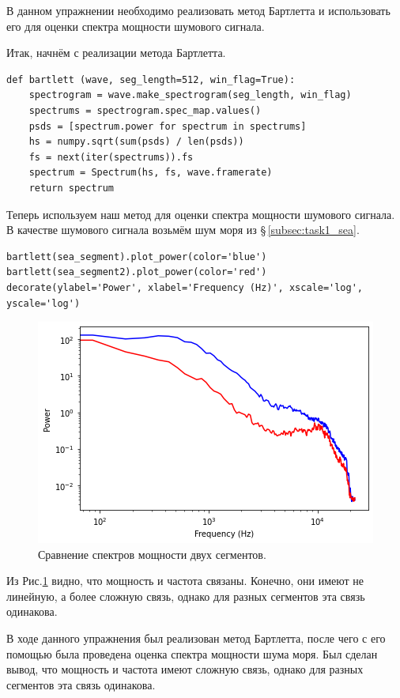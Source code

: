 \documentclass[a4paper, 14pt]{extarticle}
\begin{document}
    В данном упражнении необходимо реализовать метод Бартлетта и использовать его для оценки спектра мощности шумового
    сигнала.

    Итак, начнём с реализации метода Бартлетта.

    \begin{lstlisting}[caption= Метод Бартлетта., label={lst:task2_bartlett}]
def bartlett (wave, seg_length=512, win_flag=True):
    spectrogram = wave.make_spectrogram(seg_length, win_flag)
    spectrums = spectrogram.spec_map.values()
    psds = [spectrum.power for spectrum in spectrums]
    hs = numpy.sqrt(sum(psds) / len(psds))
    fs = next(iter(spectrums)).fs
    spectrum = Spectrum(hs, fs, wave.framerate)
    return spectrum \end{lstlisting}

    Теперь используем наш метод для оценки спектра мощности шумового сигнала. В качестве шумового сигнала возьмём шум
    моря из \S\,\ref{subsec:task1_sea}.

    \begin{lstlisting}[caption= Оценка спектра мощности двух сегментов., label={lst:task2_spectrum}]
bartlett(sea_segment).plot_power(color='blue')
bartlett(sea_segment2).plot_power(color='red')
decorate(ylabel='Power', xlabel='Frequency (Hz)', xscale='log', yscale='log')   \end{lstlisting}

    \begin{figure}[h]
        \centering
        \includegraphics[width=0.6\linewidth]{resources/Images/task2_spectrum}
        \caption{Сравнение спектров мощности двух сегментов.}
        \label{fig:task2_spectrum}
    \end{figure}

    Из Рис.\ref{fig:task2_spectrum} видно, что мощность и частота связаны. Конечно, они имеют не линейную, а более
    сложную связь, однако для разных сегментов эта связь одинакова.

    В ходе данного упражнения был реализован метод Бартлетта, после чего с его помощью была проведена оценка спектра
    мощности шума моря. Был сделан вывод, что мощность и частота имеют сложную связь, однако для разных сегментов эта
    связь одинакова.
\end{document}
